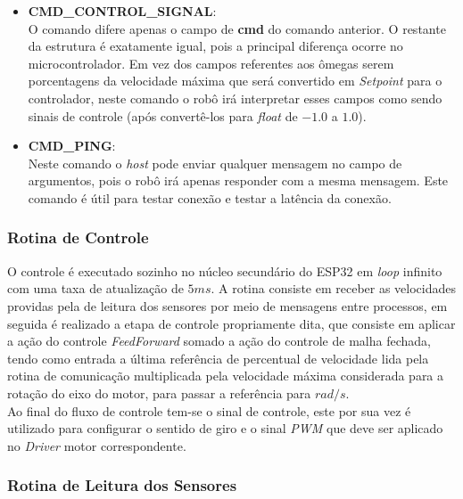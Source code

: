 \begin{itemize}
    \item \textbf{CMD\_CONTROL\_SIGNAL}:\\
        
        O comando difere apenas o campo de \textbf{cmd} do comando anterior. O restante da estrutura é exatamente igual, pois a principal diferença ocorre no microcontrolador. Em vez dos campos referentes aos ômegas serem porcentagens da velocidade máxima que será convertido em \textit{Setpoint} para o controlador, neste comando o robô irá interpretar esses campos como sendo sinais de controle (após convertê-los para \emph{float} de $-1.0$ a $1.0$).
        
    \item \textbf{CMD\_PING}:\\
        Neste comando o \textit{host} pode enviar qualquer mensagem no campo de argumentos, pois o robô irá apenas responder com a mesma mensagem. Este comando é útil para testar conexão e testar a latência da conexão.
    
\end{itemize}



\subsubsection{Rotina de Controle}
O controle é executado sozinho no núcleo secundário do ESP32 em \emph{loop} infinito com uma taxa de atualização de $5ms$. A rotina consiste em receber as velocidades providas pela de leitura dos sensores por meio de mensagens entre processos, em seguida é realizado a etapa de controle propriamente dita, que consiste em aplicar a ação do controle \textit{FeedForward} somado a ação do controle de malha fechada, tendo como entrada a última referência de percentual de velocidade lida pela rotina de comunicação multiplicada pela velocidade máxima considerada para a rotação do eixo do motor, para passar a referência para $rad/s$. \\

Ao final do fluxo de controle tem-se o sinal de controle, este por sua vez é utilizado para configurar o sentido de giro e o sinal \emph{PWM} que deve ser aplicado no \emph{Driver} motor correspondente.

\subsubsection{Rotina de Leitura dos Sensores}

